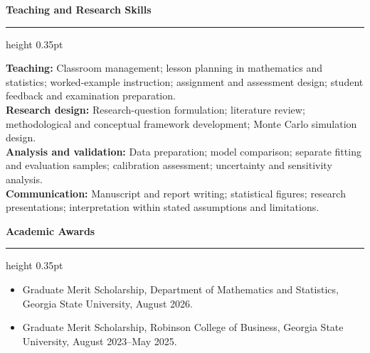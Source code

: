 \documentclass[11pt,letterpaper]{article}
\newcommand{\cvsection}[1]{%
  \par\addvspace{4pt}
  {\large\bfseries #1}\par
  \nobreak\vspace{1pt}
  \hrule height 0.35pt
  \nobreak\vspace{3pt}
}
\begin{document}
\cvsection{Teaching and Research Skills}
\textbf{Teaching:} Classroom management; lesson planning in mathematics and statistics; worked-example instruction; assignment and assessment design; student feedback and examination preparation.\\
\textbf{Research design:} Research-question formulation; literature review; methodological and conceptual framework development; Monte Carlo simulation design.\\
\textbf{Analysis and validation:} Data preparation; model comparison; separate fitting and evaluation samples; calibration assessment; uncertainty and sensitivity analysis.\\
\textbf{Communication:} Manuscript and report writing; statistical figures; research presentations; interpretation within stated assumptions and limitations.

\cvsection{Academic Awards}
\begin{itemize}
\item Graduate Merit Scholarship, Department of Mathematics and Statistics, Georgia State University, August 2026.
\item Graduate Merit Scholarship, Robinson College of Business, Georgia State University, August 2023--May 2025.
\end{itemize}
\end{document}

